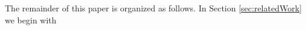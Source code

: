 \documentclass{llncs}
\begin{document}
\begin{comment}
In this paper we explore the state of the art of EL in a multilingual environment and proposing some new \textcolor{red}{ideas/resources to do better}. In particular, we propose VoxEL, a new gold standard manually annotated with equivalent text in five languages. VoxEL is built on curated text in all the languages, which leads to a more accurate evaluative process for those systems that base their models on grammatical analysis. In addition, we define VoxEL in two perspectives, a strict one that contains only those entities that undoubtedly must be annotated, and another relaxed one that also includes any Wikipedia entry\footnote{Except for the redirection and disambiguation pages.}. On the other hand, we study a new perspective to perform multilingual EL taking advantage of the automatic translation. 


We summarize our  contributions as follows:
\begin{itemize}
\item We propose that El can be evaluated from two perspectives: relaxed and strict.%
\item We propose VoxEL in a relaxed and strict perspective, a new gold standard involving the languages German, English, Spanish, French and Italian.
\item We explore the behavior of popular EL systems according VoxEL providing a rank for each of these languages.
\item We report evaluation of multilingual EL system in some of theirs supported languages 
\item We propose a new way to perform multilingual EL through automatic translations exploiting that VoxEL is based on curated text for each of these languages.
\item We study the behavior of some EL systems in languages that are not in their settings.
\end{itemize}
\end{comment}

The remainder of this paper is organized as follows. In Section \ref{sec:relatedWork} we begin with %
\end{document}

